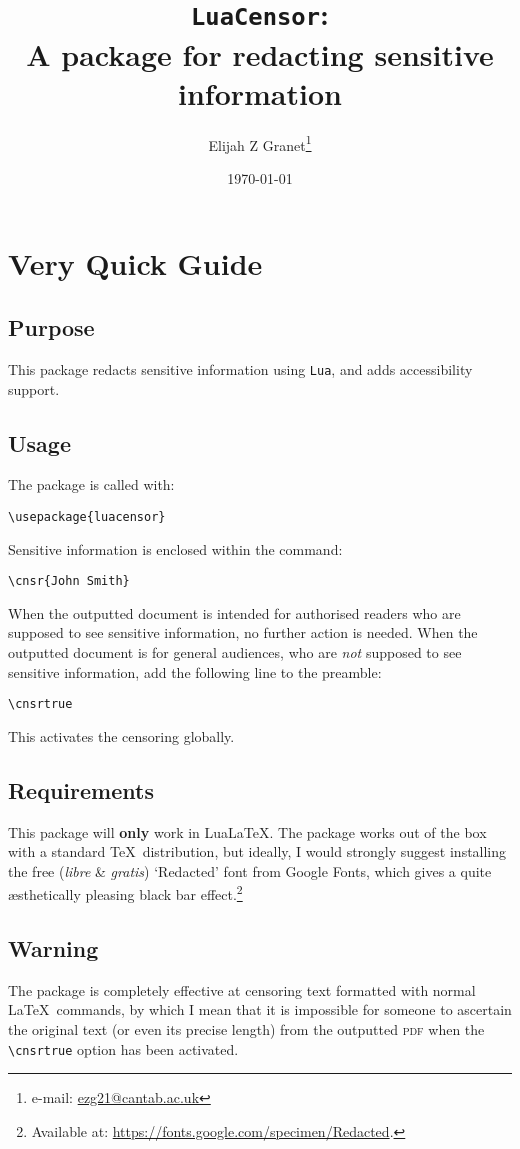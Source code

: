 \documentclass{article}
\date{\today}
\author{Elijah Z Granet\thanks{e-mail: \href{mailto:ezg21@cantab.ac.uk}{ezg21@cantab.ac.uk}}}
\title{\texttt{LuaCensor}:\\A package for redacting sensitive information}
\begin{document}
\maketitle
\tableofcontents
\section{Very Quick Guide}
\subsection{Purpose}
This package redacts sensitive information using \texttt{Lua}, and adds accessibility support.
\subsection{Usage}
The package is called with:

\begin{verbatim}
\usepackage{luacensor}
\end{verbatim}

Sensitive information is enclosed within the command:

\begin{verbatim}
\cnsr{John Smith}
\end{verbatim}

When the outputted document is intended for authorised readers who are supposed to see sensitive information, no further action is needed.  When the outputted document is for general audiences, who are \textit{not} supposed to see sensitive information, add the following line to the preamble:

\begin{verbatim}
\cnsrtrue
\end{verbatim}

This activates the censoring globally.
\subsection{Requirements}
This package will \textbf{only} work in Lua\LaTeX. The package works out of the box with a standard \TeX\ distribution, but ideally, I would strongly suggest installing the free (\textit{libre} \& \textit{gratis}) `Redacted' font from Google Fonts, which gives a quite æsthetically pleasing black bar effect.\footnote{Available at: \url{https://fonts.google.com/specimen/Redacted}.}
\subsection{\color{red}Warning}
The package is completely effective at censoring text formatted with normal \LaTeX\ commands, by which I mean that it is impossible for someone to ascertain the original text (or even its precise length) from the outputted \MakeLowercase{\textsc{PDF}} when the \verb|\cnsrtrue| option has been activated. 
\end{document}
